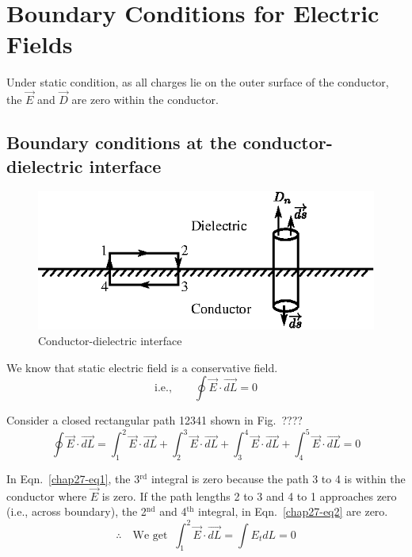 \setcounter{chapter}{26}
\chapter{Boundary Conditions for Electric Fields}\label{chap27}

Under static condition, as all charges lie on the outer surface of the conductor, the $\overrightarrow{E}$ and $\overrightarrow{D}$ are zero within the conductor.

\section{Boundary conditions at the conductor-dielectric interface}
\begin{figure}[H]
\centering
\includegraphics[scale=1.1]{images/fig1.eps}
\caption{Conductor-dielectric interface}\label{chap27-fig1}
\end{figure}

We know that static electric field is a conservative field. 
$$
\text{i.e.,}\qquad \oint \overrightarrow{E} \cdot \overrightarrow{dL} = 0
$$

Consider a closed rectangular path 12341 shown in Fig.~????
\begin{equation}
\oint \overrightarrow{E} \cdot \overrightarrow{dL} = \int_{1}^{2} \overrightarrow{E} \cdot \overrightarrow{dL} + \int_{2}^{3} \overrightarrow{E} \cdot \overrightarrow{dL} + \int_{3}^{4} \overrightarrow{E} \cdot \overrightarrow{dL} + \int_{4}^{5} \overrightarrow{E} \cdot \overrightarrow{dL} = 0\label{chap27-eq1}
\end{equation}

In Eqn.~\eqref{chap27-eq1}, the 3$^{\text{rd}}$ integral is zero because the path 3 to 4 is within the conductor where $\overrightarrow{E}$ is zero. If the path lengths 2 to 3 and 4 to 1 approaches zero (i.e., across boundary), the 2$^{\text{nd}}$ and 4$^{\text{th}}$ integral, in Eqn.~\eqref{chap27-eq2} are zero.
\begin{equation}
\therefore\quad \text{We get } \ \int_{1}^{2} \overrightarrow{E} \cdot \overrightarrow{dL} = \int E_{t}dL = 0\label{chap27-eq2}
\end{equation}

